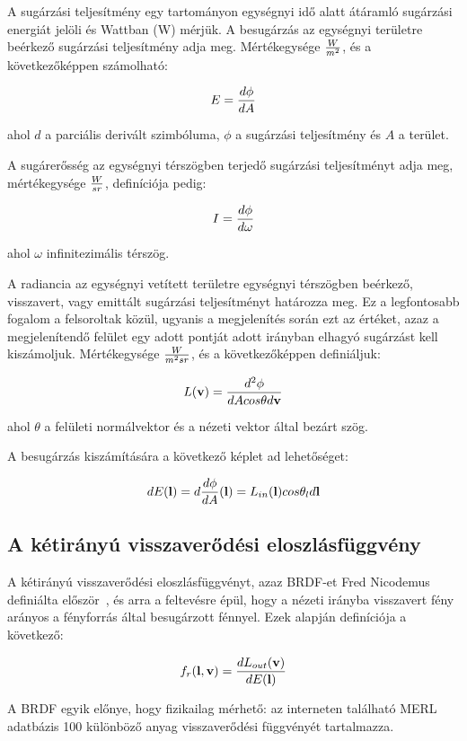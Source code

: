 A sugárzási teljesítmény egy tartományon egységnyi idő alatt átáramló sugárzási energiát jelöli és Wattban (W) mérjük. A besugárzás az egységnyi területre beérkező sugárzási teljesítmény adja meg. Mértékegysége \(W \over m^2\), és a következőképpen számolható:

\[
E = { { d\phi } \over { dA } }
\]

ahol \(d\) a parciális derivált szimbóluma, \(\phi\) a sugárzási teljesítmény és \(A\) a terület.

A sugárerősség az egységnyi térszögben terjedő sugárzási teljesítményt adja meg, mértékegysége \(W \over {sr}\), definíciója pedig:

\[
I = { { d\phi } \over { d\omega } }
\]

ahol \(\omega\) infinitezimális térszög.

A radiancia az egységnyi vetített területre egységnyi térszögben beérkező, visszavert, vagy emittált sugárzási teljesítményt határozza meg. Ez a legfontosabb fogalom a felsoroltak közül, ugyanis a megjelenítés során ezt az értéket, azaz a megjelenítendő felület egy adott pontját adott irányban elhagyó sugárzást kell kiszámoljuk. Mértékegysége \(W \over {m^2sr}\), és a következőképpen definiáljuk:

\[
L(\mathbf{v}) = { { d^2\phi } \over { dA cos\theta d\mathbf{v} } }
\]

ahol \(\theta\) a felületi normálvektor és a nézeti vektor által bezárt szög.

A besugárzás kiszámítására a következő képlet ad lehetőséget:

\[
dE(\mathbf{l}) = d { {d\phi} \over {dA} } (\mathbf{l}) = L_{in}(\mathbf{l}) cos\theta_l d\mathbf{l}
\]

\subsection{A kétirányú visszaverődési eloszlásfüggvény}

A kétirányú visszaverődési eloszlásfüggvényt, azaz BRDF-et Fred Nicodemus definiálta először~\cite{nicodemus1965directional}, és arra a feltevésre épül, hogy a nézeti irányba visszavert fény arányos a fényforrás által besugárzott fénnyel. Ezek alapján definíciója a következő:

\[
f_r(\mathbf{l}, \mathbf{v}) = { { dL_{out}(\mathbf{v}) } \over {dE(\mathbf{l})} }
\]

A BRDF egyik előnye, hogy fizikailag mérhető: az interneten található MERL adatbázis 100 különböző anyag visszaverődési függvényét tartalmazza.

